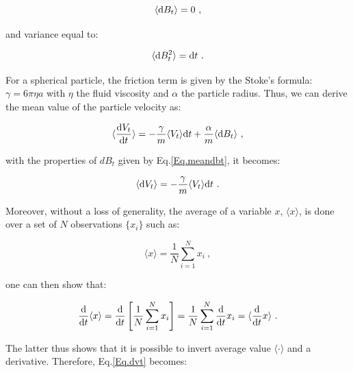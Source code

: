 \begin{equation}
	\langle \textnormal{d}B_t \rangle  = 0~,
	\label{Eq.meandbt}
\end{equation}

and variance equal to: 

\begin{equation}
	\langle \textnormal{d}B_t ^2 \rangle = \textnormal{d}t~.
	\label{Eq.meandbt2}
\end{equation}

For a spherical particle, the friction term is given by the Stoke's formula: $\gamma = 6\pi \eta a$ with $\eta$ the fluid viscosity and $\alpha$ the particle radius. Thus, we can derive the mean value of the particle velocity as:


\begin{equation}
	\langle  \frac{ \textnormal{d}V_t}{\textnormal{d}t} \rangle = - \frac{\gamma}{m} \langle V_t \rangle \textnormal{d}t  + \frac{\alpha}{m} \langle  \textnormal{d}B_t \rangle ~,
	\label{Eq.langevinsd}
\end{equation}

with the properties of $dB_t$ given by Eq.\ref{Eq.meandbt}, it becomes:

\begin{equation}
	\langle  \textnormal{d}V_t \rangle = - \frac{\gamma}{m} \langle V_t \rangle \textnormal{d}t ~.
	\label{Eq.dvt}
\end{equation}

Moreover, without a loss of generality, the average of a variable $x$, $\langle x \rangle$, is done over a set of $N$ observations $\{x_i\}$ such as:

\begin{equation}
	\langle x \rangle = \frac{1}{N} \sum _{i=1}^N x_i ~,
\end{equation}

one can then show that:

\begin{equation}
	\frac{\textnormal{d}}{\textnormal{d}t}\langle x \rangle = \frac{\textnormal{d}}{ \textnormal{d}t} \left[\frac{1}{N} \sum _{i=1}^N x_i \right] = 
	\frac{1}{N} \sum _{i=1}^N \frac{\textnormal{d}}{ \textnormal{d}t} x_i = \langle\frac{\textnormal{d}}{\textnormal{d}t} x \rangle ~.
\end{equation}

The latter thus shows that it is possible to invert average value $\langle \cdot \rangle$ and a derivative. Therefore, Eq.\ref{Eq.dvt} becomes:

